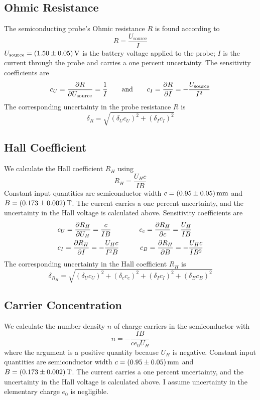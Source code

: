 \documentclass[11pt, a4paper]{article}
\newcommand{\eqtext}[1]{\qquad \text{#1} \qquad}
\begin{document}
\subsection{Ohmic Resistance}
The semiconducting probe's Ohmic resistance $ R $ is found according to
\begin{equation*}
	R = \frac{U_{\text{source}}}{I} 
\end{equation*}
$ U_{\text{source}} = \SI{1.50 \pm 0.05}{\volt} $ is the battery voltage applied to the probe; $ I $ is the current through the probe and carries a one percent uncertainty. The sensitivity coefficients are
\begin{equation*}
	c_{U} = \pdv{R}{U_{\text{source}}} = \frac{1}{I} \eqtext{and} c_{I} = \pdv{R}{I} = -\frac{U_{\text{source}}}{I^{2}}
\end{equation*}
The corresponding uncertainty in the probe resistance $ R $ is
\begin{equation*}
	\delta_{R} = \sqrt{(\delta_{U}c_{U})^{2} + (\delta_{I}c_{I})^{2}}
\end{equation*}

\subsection{Hall Coefficient}
We calculate the Hall coefficient $ R_{H} $ using
\begin{equation*}
	R_{H} =  \frac{U_{H}c}{IB}
\end{equation*}
Constant input quantities are semiconductor width $ c = \SI{0.95 \pm 0.05}{\milli \meter} $ and $ B = \SI{0.173\pm 0.002}{\tesla} $. The current carries a one percent uncertainty, and the uncertainty in the Hall voltage is calculated above. Sensitivity coefficients are
\begin{align*}
	& c_{U} = \pdv{R_{H}}{U_{H}} = \frac{c}{IB} \qquad  \qquad c_{c} = \pdv{R_{H}}{c} = \frac{U_{H}}{IB}\\
	& c_{I} = \pdv{R_{H}}{I} = -\frac{U_{H}c}{I^{2}B} \qquad \quad c_{B} = \pdv{R_{H}}{B} = -\frac{U_{H}c}{IB^{2}}
\end{align*}
The corresponding uncertainty in the Hall coefficient $ R_{H} $ is
\begin{equation*}
	\delta_{R_{H}} = \sqrt{(\delta_{U}c_{U})^{2} + (\delta_{c}c_{c})^{2} + (\delta_{I}c_{I})^{2} + (\delta_{B}c_{B})^{2}}
\end{equation*}
		
		
\subsection{Carrier Concentration}
We calculate the number density $ n $ of charge carriers in the semiconductor with
\begin{equation*}
	n = -\frac{IB}{ce_{0}U_{H}}
\end{equation*}	
where the argument is a positive quantity because $ U_{H} $ is negative. Constant input quantities are semiconductor width $ c = \SI{0.95 \pm 0.05}{\milli \meter} $ and $ B = \SI{0.173\pm 0.002}{\tesla} $. The current carries a one percent uncertainty, and the uncertainty in the Hall voltage is calculated above. I assume uncertainty in the elementary charge $ e_{0} $ is negligible.
\end{document}
